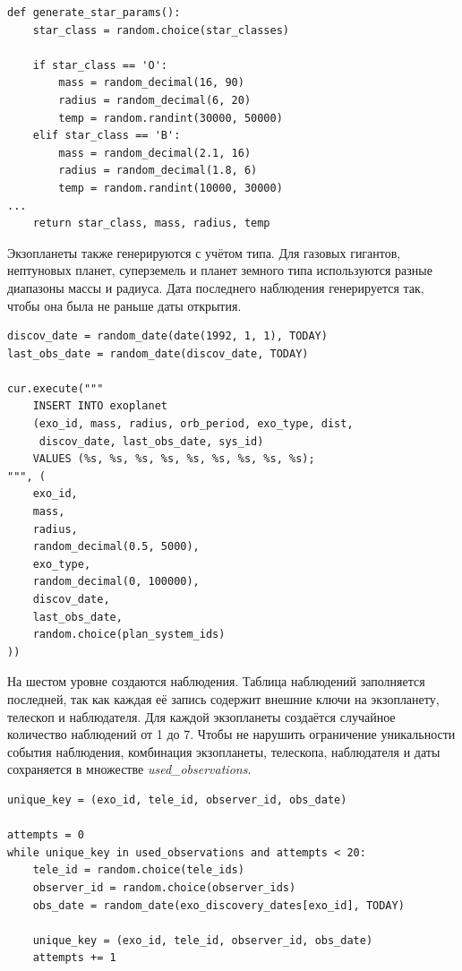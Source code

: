 \documentclass[14pt,a4paper]{extarticle}
\begin{document}
\begin{lstlisting}[caption={Генерация параметров звезды (полный код см. в разделе \hyperref[b][Приложение Б]).}]
def generate_star_params():
    star_class = random.choice(star_classes)

    if star_class == 'O':
        mass = random_decimal(16, 90)
        radius = random_decimal(6, 20)
        temp = random.randint(30000, 50000)
    elif star_class == 'B':
        mass = random_decimal(2.1, 16)
        radius = random_decimal(1.8, 6)
        temp = random.randint(10000, 30000)
...
    return star_class, mass, radius, temp
\end{lstlisting}

Экзопланеты также генерируются с учётом типа. Для газовых гигантов, нептуновых планет, суперземель и планет земного типа используются разные диапазоны массы и радиуса. Дата последнего наблюдения генерируется так, чтобы она была не раньше даты открытия.

\begin{lstlisting}[caption={Вставка экзопланеты}]
discov_date = random_date(date(1992, 1, 1), TODAY)
last_obs_date = random_date(discov_date, TODAY)

cur.execute("""
    INSERT INTO exoplanet
    (exo_id, mass, radius, orb_period, exo_type, dist,
     discov_date, last_obs_date, sys_id)
    VALUES (%s, %s, %s, %s, %s, %s, %s, %s, %s);
""", (
    exo_id,
    mass,
    radius,
    random_decimal(0.5, 5000),
    exo_type,
    random_decimal(0, 100000),
    discov_date,
    last_obs_date,
    random.choice(plan_system_ids)
))
\end{lstlisting}

На шестом уровне создаются наблюдения. Таблица наблюдений заполняется последней, так как каждая её запись содержит внешние ключи на экзопланету, телескоп и наблюдателя. Для каждой экзопланеты создаётся случайное количество наблюдений от 1 до 7. Чтобы не нарушить ограничение уникальности события наблюдения, комбинация экзопланеты, телескопа, наблюдателя и даты сохраняется в множестве \textit{used\_observations}.

\begin{lstlisting}[caption={Проверка уникальности наблюдения}]
unique_key = (exo_id, tele_id, observer_id, obs_date)

attempts = 0
while unique_key in used_observations and attempts < 20:
    tele_id = random.choice(tele_ids)
    observer_id = random.choice(observer_ids)
    obs_date = random_date(exo_discovery_dates[exo_id], TODAY)

    unique_key = (exo_id, tele_id, observer_id, obs_date)
    attempts += 1
\end{lstlisting}
\end{document}
